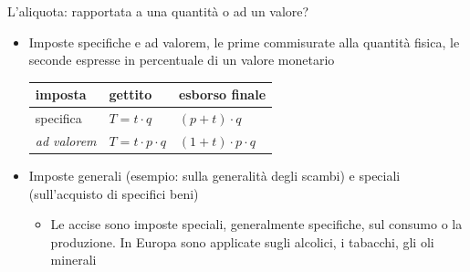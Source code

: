 \documentclass[aspectratio=64,12pt]{beamer}
\begin{document}
\begin{frame}{L'aliquota: rapportata a una quantità o ad un valore?}
\begin{itemize}
\item Imposte \alert{specifiche} e \alert{ad valorem}, le prime commisurate alla quantità
fisica, le seconde espresse in percentuale di un valore monetario
\begin{center}
\begin{tabular}{lll}
imposta & gettito & esborso finale\\[0pt]
\hline
specifica & $T = t\cdot q$ & $(p+t)\cdot q$\\[0pt]
\emph{ad valorem} & $T = t\cdot p\cdot q$ & $(1+t)\cdot p\cdot q$\\[0pt]
\end{tabular}
\end{center}
\item Imposte \alert{generali} (esempio: sulla generalità degli scambi) e \alert{speciali}
(sull'acquisto di specifici beni)
\begin{itemize}
\item Le \alert{accise} sono imposte speciali, generalmente specifiche, sul consumo o
la produzione. In Europa sono applicate sugli alcolici, i tabacchi, gli
oli minerali
\end{itemize}
\end{itemize}
\end{frame}
\end{document}
